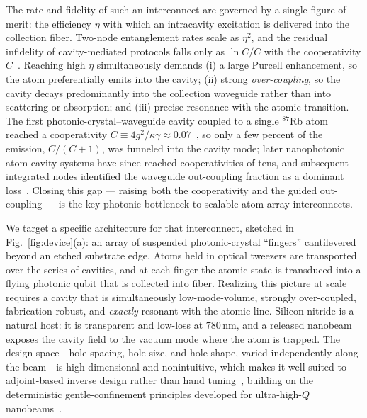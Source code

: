\documentclass[%
 reprint,
 amsmath,amssymb,
 aps,prx,
 superscriptaddress,
]{revtex4-2}
\newcommand{\unit}[1]{\,\mathrm{#1}}
\begin{document}
The rate and fidelity of such an interconnect are governed by a single figure of
merit: the efficiency $\eta$ with which an intracavity excitation is delivered
into the collection fiber. Two-node entanglement rates scale as $\eta^2$, and the
residual infidelity of cavity-mediated protocols falls only as $\ln C/C$ with the
cooperativity $C$~\cite{reiserer2015,menon2020}. Reaching high $\eta$
simultaneously demands (i) a large Purcell enhancement, so the atom preferentially
emits into the cavity; (ii) strong \emph{over-coupling}, so the cavity decays
predominantly into the collection waveguide rather than into scattering or
absorption; and (iii) precise resonance with the atomic transition. The first
photonic-crystal--waveguide cavity coupled to a single $^{87}$Rb atom reached a
cooperativity $C\equiv4g^2/\kappa\gamma\approx0.07$~\cite{thompson2013}, so only a
few percent of the emission, $C/(C{+}1)$, was funneled into the cavity mode; later
nanophotonic atom-cavity systems have since reached cooperativities of tens, and
subsequent integrated nodes identified the waveguide out-coupling fraction as a
dominant loss~\cite{menon2020,menon2024,menon2025,covey2019}. Closing this gap ---
raising both the cooperativity and the guided out-coupling --- is the key photonic
bottleneck to scalable atom-array interconnects.

We target a specific architecture for that interconnect, sketched in
Fig.~\ref{fig:device}(a): an array of suspended photonic-crystal ``fingers''
cantilevered beyond an etched substrate edge. Atoms held in optical tweezers are
transported over the series of cavities, and at each finger the atomic state is
transduced into a flying photonic qubit that is collected into fiber. Realizing
this picture at scale requires a cavity that is simultaneously low-mode-volume,
strongly over-coupled, fabrication-robust, and \emph{exactly} resonant with the
atomic line. Silicon nitride is a natural host: it is transparent and low-loss at
$780\unit{nm}$, and a released nanobeam exposes the cavity field to the vacuum
mode where the atom is trapped. The design space---hole spacing, hole size, and
hole shape, varied independently along the beam---is high-dimensional and
nonintuitive, which makes it well suited to adjoint-based inverse design rather
than hand tuning~\cite{molesky2018,piggott2015}, building on the deterministic
gentle-confinement principles developed for ultra-high-$Q$
nanobeams~\cite{quan2011,tanaka2008,bazin2014}.
\end{document}
